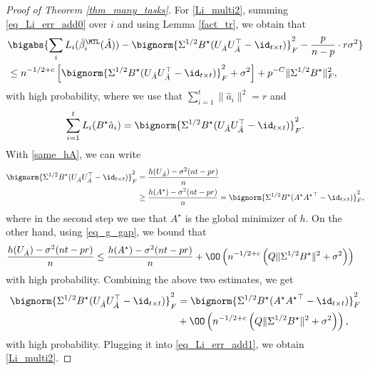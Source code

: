 \documentclass[aos,preprint]{imsart}
\begin{document}
\begin{proof}[Proof of Theorem \ref{thm_many_tasks}]
		For \eqref{Li_multi2}, summing \eqref{eq_Li_err_add0} over $i$ and using Lemma \ref{fact_tr}, we obtain that 
		\begin{align}
			&\bigabs{\sum_i L_i(\hat{\beta}_i^{\MTL}(\hat A)) -\bignorm{\Sigma^{1/2} B^{\star} (U_{\hat A}U_{\hat A}^{\top} - \id_{t\times t})}_F^2 - \frac{p }{n-p}\cdot r \sigma^2  }\nonumber \\
			&\le  n^{-1/2+c} \left[\bignorm{\Sigma^{1/2} B^{\star} (U_{\hat A}U_{\hat A}^{\top} - \id_{t\times t})}_F^2 + \sigma^2 \right] + p^{-C}  \|{\Sigma^{1/2} B^{\star}}\|_F^2 ,  \label{eq_Li_err_add1}
		\end{align}
		with high probability, where we use that $\sum_{i=1}^t\| \hat a_i\|^2=r$ and 		
		$$\sum_{i=1}^t L_i(B^{\star} \hat {a}_i)=\bignorm{\Sigma^{1/2} B^{\star} (U_{\hat A}U_{\hat A}^{\top} - \id_{t\times t})}_F^2.$$
		With \eqref{same_hA}, we can write 
		\begin{align*}
		  \bignorm{\Sigma^{1/2} B^{\star} (U_{\hat A}U_{\hat A}^{\top} - \id_{t\times t})}_F^2 &= \frac{h(U_{\hat A})-\sigma^2 (n t - p r)}{n} \\
		& \ge  \frac{h( A^\star)-\sigma^2 (n t - p r)}{n} =  \bignorm{\Sigma^{1/2} B^{\star} (A^\star{A^\star}^{\top} - \id_{t\times t})}_F^2,
		\end{align*}
		where in the second step we use that $A^\star$ is the global minimizer of $h$. On the other hand, using \eqref{eq_g_gap}, we bound that
		\begin{align*}
	&\frac{h(U_{\hat A})-\sigma^2 (n t - p r)}{n} 	\le \frac{h( A^\star)-\sigma^2 (n t - p r)}{n} + \OO\left( n^{-1/2+c} \left(Q \|\Sigma^{1/2} B^{\star}\|^2 +  \sigma^2\right)\right) 
		\end{align*}	
		with high probability.
		Combining the above two estimates, we get 
		\begin{align*}
		\bignorm{\Sigma^{1/2} B^{\star} (U_{\hat A}U_{\hat A}^{\top} - \id_{t\times t})}_F^2 & = \bignorm{\Sigma^{1/2} B^{\star} (A^\star{A^\star}^{\top} - \id_{t\times t})}_F^2 \\
		&+ \OO\left( n^{-1/2+c} \left(Q \|\Sigma^{1/2} B^{\star}\|^2 +  \sigma^2\right)\right) ,\end{align*}
		with high probability. Plugging it into  \eqref{eq_Li_err_add1}, we obtain \eqref{Li_multi2}.			
	\end{proof}
\end{document}
